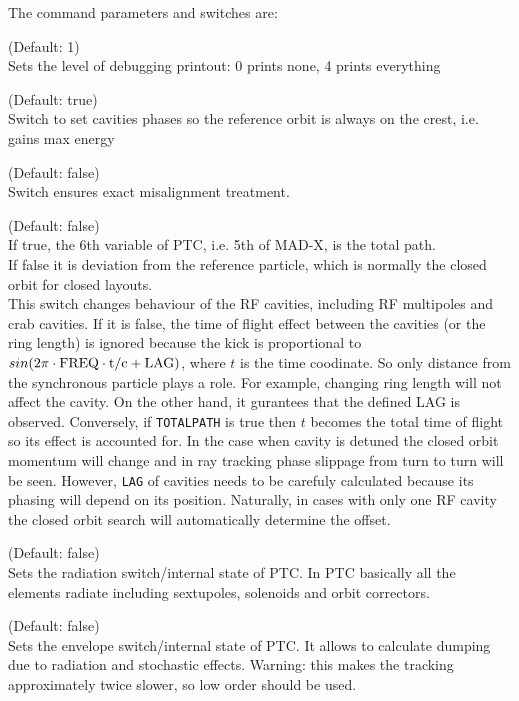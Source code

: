 The command parameters and switches are:
\begin{madlist}
	 (Default: 1)\\
	Sets the level of debugging printout: 0 prints none, 4 prints everything   
	
	 (Default: true)\\
	Switch to set cavities phases so the reference orbit is always on
	the crest, i.e. gains max energy    
	
	 (Default: false)\\
	Switch ensures exact misalignment treatment.   
	
	 (Default: false)\\
	If true, the 6th variable of PTC, i.e. 5th of MAD-X, is the total path.  \\
	If false it is deviation from the reference particle,
	which is normally the closed orbit for closed layouts. \\
	This switch changes behaviour of the RF cavities, 
	including RF multipoles and crab cavities. 
	If it is false, the time of flight effect between the cavities
	(or the ring length) is ignored because the kick is proportional to \\
	$sin(2\pi \cdot \rm{FREQ} \cdot t/c + \rm{LAG})$, where $t$ is the time coodinate.
	So only distance from the synchronous particle plays a role.
	For example, changing ring length will not affect the cavity.
	On the other hand, it gurantees that the defined LAG is observed.
	Conversely, if \texttt{TOTALPATH} is true then $t$ becomes the total time of flight
	so its effect is accounted for. In the case when cavity is detuned 
	the closed orbit momentum will change and in ray tracking phase slippage from turn
	to turn will be seen. However, \texttt{LAG} of cavities needs to be 
	carefuly calculated because its phasing will depend on its position. 
	Naturally, in cases with only one RF cavity the closed orbit search will automatically
	determine the offset. 
	
	 (Default: false)\\    
	Sets the radiation switch/internal state of PTC. In PTC basically all the elements
	radiate including sextupoles, solenoids and orbit correctors.

	 (Default: false)\\    
	Sets the envelope switch/internal state of PTC. It allows to calculate 
	dumping due to radiation and stochastic effects. 
	Warning: this makes the tracking approximately twice slower, so low order
	should be used. 


\end{madlist}
